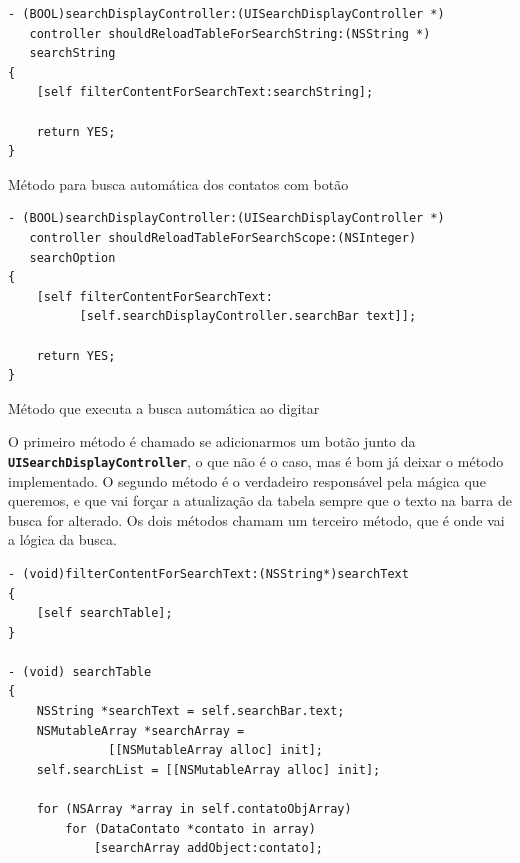 \documentclass[a4paper,12pt,brazil,doubleside]{book}
\begin{document}
\begin{singlespace}
\bigskip

\begin{listing}[H]
\begin{verbatim}
- (BOOL)searchDisplayController:(UISearchDisplayController *)
   controller shouldReloadTableForSearchString:(NSString *)
   searchString
{
    [self filterContentForSearchText:searchString];

    return YES;
}
\end{verbatim}
\caption{Método para busca automática dos contatos com botão}
\end{listing}

\bigskip

\begin{listing}[H]
\begin{verbatim}
- (BOOL)searchDisplayController:(UISearchDisplayController *)
   controller shouldReloadTableForSearchScope:(NSInteger)
   searchOption
{
    [self filterContentForSearchText:
          [self.searchDisplayController.searchBar text]];
    
    return YES;
}
\end{verbatim}
\caption{Método que executa a busca automática ao digitar}
\end{listing}


O primeiro método é chamado se adicionarmos um botão junto da\\
\texttt{\textbf{UISearchDisplayController}}, o que não é o caso, mas é bom já deixar o método implementado. O segundo método é o verdadeiro responsável pela mágica que queremos, e que vai forçar a atualização da tabela sempre que o texto na barra de busca for alterado. Os dois métodos chamam um terceiro método, que é onde vai a lógica da busca.

\begin{listing}[H]
\begin{verbatim}
- (void)filterContentForSearchText:(NSString*)searchText
{
    [self searchTable];
}

- (void) searchTable
{
    NSString *searchText = self.searchBar.text;
    NSMutableArray *searchArray =
              [[NSMutableArray alloc] init];
    self.searchList = [[NSMutableArray alloc] init];
    
    for (NSArray *array in self.contatoObjArray)
        for (DataContato *contato in array)
            [searchArray addObject:contato];
    

\end{verbatim}
\end{listing}
\end{singlespace}
\end{document}
